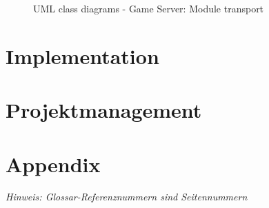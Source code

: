 \documentclass[11pt,ngerman]{article}
\begin{document}
            \begin{figure}[H]
                \centering
                \caption{UML class diagrams - Game Server: Module transport}
                \label{fig:UMLclassdiagram_Moduletransport}
            \end{figure}
            \newpage

    \section{Implementation}

    \section{Projektmanagement}


     \newpage

    \section{Appendix}
    \textit{Hinweis: Glossar-Referenznummern sind Seitennummern}
    \printglossary
\end{document}
